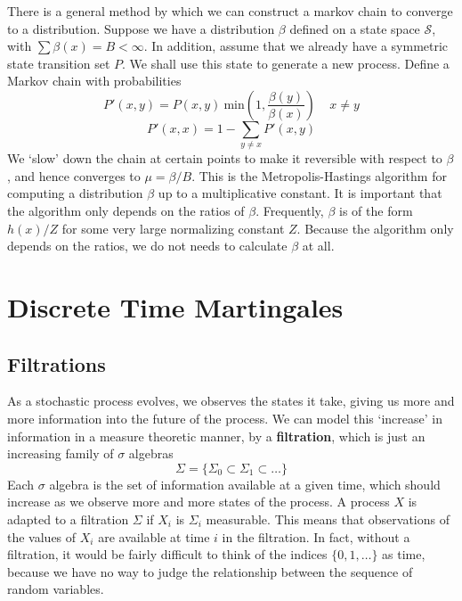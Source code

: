 There is a general method by which we can construct a markov chain to converge to a distribution. Suppose we have a distribution $\beta$ defined on a state space $\mathcal{S}$, with $\sum \beta(x) = B < \infty$. In addition, assume that we already have a symmetric state transition set $P$. We shall use this state to generate a new process. Define a Markov chain with probabilities
%
\[ P'(x,y) = P(x,y)\ \text{min}(1, \frac{\beta(y)}{\beta(x)})\ \ \ \ \ x \neq y \]
%
\[ P'(x,x) = 1 - \sum_{y \neq x} P'(x,y) \]
%
We `slow' down the chain at certain points to make it reversible with respect to $\beta$, and hence converges to $\mu = \beta/B$. This is the Metropolis-Hastings algorithm for computing a distribution $\beta$ up to a multiplicative constant. It is important that the algorithm only depends on the ratios of $\beta$. Frequently, $\beta$ is of the form $h(x)/Z$ for some very large normalizing constant $Z$. Because the algorithm only depends on the ratios, we do not needs to calculate $\beta$ at all.

























\chapter{Discrete Time Martingales}

\section{Filtrations}

As a stochastic process evolves, we observes the states it take, giving us more and more information into the future of the process. We can model this `increase' in information in a measure theoretic manner, by a {\bf filtration}, which is just an increasing family of $\sigma$ algebras
%
\[ \Sigma = \{ \Sigma_0 \subset \Sigma_1 \subset \dots \} \]
%
Each $\sigma$ algebra is the set of information available at a given time, which should increase as we observe more and more states of the process. A process $X$ is adapted to a filtration $\Sigma$ if $X_i$ is $\Sigma_i$ measurable. This means that observations of the values of $X_i$ are available at time $i$ in the filtration. In fact, without a filtration, it would be fairly difficult to think of the indices $\{ 0, 1, \dots \}$ as time, because we have no way to judge the relationship between the sequence of random variables.

